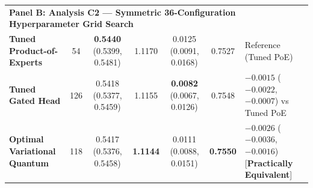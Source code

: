 \documentclass[10pt,a4paper,twoside]{article}
\begin{document}
\begin{table}[t]
\begin{tabular}{l c c c c c l}
\midrule
\multicolumn{7}{l}{\textbf{Panel B: Analysis C2 --- Symmetric 36-Configuration Hyperparameter Grid Search}} \\
\textbf{Tuned Product-of-Experts} & 54 & \textbf{0.5440} (0.5399, 0.5481) & 1.1170 & 0.0125 (0.0091, 0.0168) & 0.7527 & Reference (Tuned PoE) \\
\textbf{Tuned Gated Head} & 126 & 0.5418 (0.5377, 0.5459) & 1.1155 & \textbf{0.0082} (0.0067, 0.0126) & 0.7548 & $-0.0015$ ($-0.0022$, $-0.0007$) vs Tuned PoE \\
\textbf{Optimal Variational Quantum} & 118 & 0.5417 (0.5376, 0.5458) & \textbf{1.1144} & 0.0111 (0.0088, 0.0151) & \textbf{0.7550} & $\mathbf{-0.0026}$ ($-0.0036$, $-0.0016$) [\textbf{\color{royalazure}Practically Equivalent}] \\
\bottomrule
\end{tabular}
\vspace{6pt}
\end{table}
\end{document}
